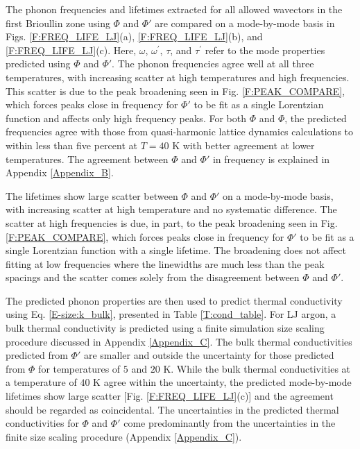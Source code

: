 \documentclass[letterpaper,12pt]{article}
\begin{document}
The phonon frequencies and lifetimes extracted for all allowed wavectors in the first Brioullin zone using $\Phi$ and $\Phi'$ are compared on a mode-by-mode basis in Figs$.$ \ref{F:FREQ_LIFE_LJ}(a), \ref{F:FREQ_LIFE_LJ}(b), and \ref{F:FREQ_LIFE_LJ}(c). Here, $\omega$, $\omega^{'}$, $\tau$, and $\tau^{'}$  refer to the mode properties predicted using $\Phi$ and $\Phi'$. The phonon frequencies agree well at all three temperatures, with increasing scatter at high temperatures and high frequencies.  This scatter is due to the peak broadening seen in Fig$.$ \ref{F:PEAK_COMPARE}, which forces peaks close in frequency for $\Phi'$ to be fit as a single Lorentzian function and affects only high frequency peaks. For both $\Phi$ and $\Phi$, the predicted frequencies agree with those from quasi-harmonic lattice dynamics calculations to within less than five percent at $T=40$ K with better agreement at lower temperatures.  The agreement between $\Phi$ and $\Phi'$ in frequency is explained in Appendix \ref{Appendix_B}.

The lifetimes show large scatter between $\Phi$ and $\Phi'$ on a mode-by-mode basis, with increasing scatter at high temperature and no systematic difference. The scatter at high frequencies is due, in part, to the peak broadening seen in Fig$.$ \ref{F:PEAK_COMPARE}, which forces peaks close in frequency for $\Phi'$ to be fit as a single Lorentzian function with a single lifetime. The broadening does not affect fitting at low frequencies where the linewidths are much less than the peak spacings and the scatter comes solely from the disagreement between $\Phi$ and $\Phi'$.

The predicted phonon properties are then used to predict thermal conductivity using Eq$.$ \eqref{E-size:k_bulk}, presented in Table \ref{T:cond_table}. For LJ argon, a bulk thermal conductivity is predicted using a finite simulation size scaling procedure discussed in Appendix \ref{Appendix_C}. The bulk thermal conductivities predicted from $\Phi'$ are smaller and outside the uncertainty for those predicted from $\Phi$ for temperatures of $5$ and $20$ K. While the bulk thermal conductivities at a temperature of $40$ K agree within the uncertainty, the predicted mode-by-mode lifetimes show large scatter [Fig$.$ \ref{F:FREQ_LIFE_LJ}(c)] and the agreement should be regarded as coincidental. The uncertainties in the predicted thermal conductivities for $\Phi$ and $\Phi'$ come predominantly from the uncertainties in the finite size scaling procedure (Appendix \ref{Appendix_C}).
\end{document}
